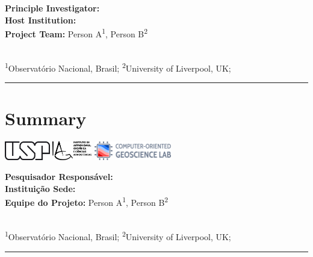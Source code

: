 \documentclass[onecolumn,a4paper,12pt]{article}
\newcommand{\Team}{%
  Person A\textsuperscript{1},
  Person B\textsuperscript{2}
}
\newcommand{\Affiliations}{%
  \textsuperscript{1}Observatório Nacional, Brasil;
  \textsuperscript{2}University of Liverpool, UK;
}
\begin{document}
\thispagestyle{plain}
\begin{FlushLeft}
  \begin{spacing}{2}
    {\LARGE \textbf{\Title}}
  \end{spacing}
  \vspace{0.1cm}
  \textbf{Principle Investigator:} \PIname
  \\[0.3cm]
  \textbf{Host Institution:} \Institution
  \\[0.3cm]
  \textbf{Project Team:} \Team
  \\[0.1cm]
  {\footnotesize \Affiliations}
  \\[0.5cm]
  {\color{lightgray}\hrule height 1.5pt}
\end{FlushLeft}

\section*{\normalsize Summary}
\beginnumbering
\autopar


\lipsum[1-3]  %


\endnumbering
\vfill
\begin{center}
  \includegraphics[height=0.8cm]{figures/usp.png}\hspace{1cm}
  \includegraphics[height=0.8cm]{figures/iag.png}\hspace{1cm}
  \includegraphics[height=0.8cm]{figures/compgeolab.png}
\end{center}

\newpage
\thispagestyle{plain}
\begin{FlushLeft}
  \begin{spacing}{2}
    {\LARGE \textbf{\TitlePt}}
  \end{spacing}
  \vspace{0.1cm}
  \textbf{Pesquisador Responsável:} \PIname
  \\[0.3cm]
  \textbf{Instituição Sede:} \Institution
  \\[0.3cm]
  \textbf{Equipe do Projeto:} \Team
  \\[0.1cm]
  {\footnotesize \Affiliations}
  \\[0.5cm]
  {\color{lightgray}\hrule height 1.5pt}
\end{FlushLeft}
\end{document}
